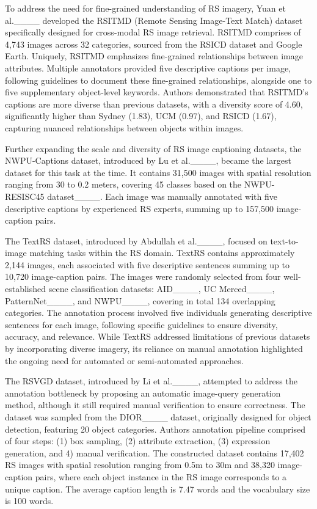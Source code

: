 To address the need for fine-grained understanding of RS imagery, Yuan et al.____ developed the RSITMD (Remote Sensing Image-Text Match) dataset specifically designed for cross-modal RS image retrieval. RSITMD comprises of 4,743 images across 32 categories, sourced from the RSICD dataset and Google Earth. Uniquely, RSITMD emphasizes fine-grained relationships between image attributes. Multiple annotators provided five descriptive captions per image, following guidelines to document these fine-grained relationships, alongside one to five supplementary object-level keywords. Authors demonstrated that RSITMD's captions are more diverse than previous datasets, with a diversity score of 4.60, significantly higher than Sydney (1.83), UCM (0.97), and RSICD (1.67), capturing nuanced relationships between objects within images. 

Further expanding the scale and diversity of RS image captioning datasets, the NWPU-Captions dataset, introduced by Lu et al.____, became the largest dataset for this task at the time. It contains 31,500 images with spatial resolution ranging from 30 to 0.2 meters, covering 45 classes based on the NWPU-RESISC45 dataset____. Each image was manually annotated with five descriptive captions by experienced RS experts, summing up to 157,500 image-caption pairs.

The TextRS dataset, introduced by Abdullah et al.____, focused on text-to-image matching tasks within the RS domain. TextRS contains approximately 2,144 images, each associated with five descriptive sentences summing up to 10,720 image-caption pairs. The images were randomly selected from four well-established scene classification datasets: AID____, UC Merced____, PatternNet____, and NWPU____, covering in total 134 overlapping categories. The annotation process involved five individuals generating descriptive sentences for each image, following specific guidelines to ensure diversity, accuracy, and relevance. While TextRS addressed limitations of previous datasets by incorporating diverse imagery, its reliance on manual annotation highlighted the ongoing need for automated or semi-automated approaches.

The RSVGD dataset, introduced by Li et al.____, attempted to address the annotation bottleneck by proposing an automatic image-query generation method, although it still required manual verification to ensure correctness. The dataset was sampled from the DIOR____ dataset, originally designed for object detection, featuring 20 object categories. Authors annotation pipeline comprised of four steps: (1) box sampling, (2) attribute extraction, (3) expression generation, and 4) manual verification. The constructed dataset contains 17,402 RS images with spatial resolution ranging from 0.5m to 30m and 38,320 image-caption pairs, where each object instance in the RS image corresponds to a unique caption. The average caption length is 7.47 words and the vocabulary size is 100 words.

